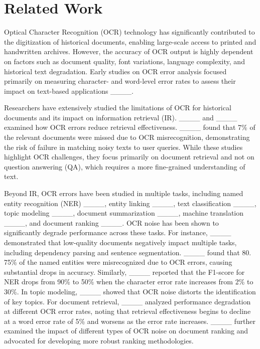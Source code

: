 \section{Related Work}
Optical Character Recognition (OCR) technology has significantly contributed to the digitization of historical documents, enabling large-scale access to printed and handwritten archives. However, the accuracy of OCR output is highly dependent on factors such as document quality, font variations, language complexity, and historical text degradation. Early studies on OCR error analysis focused primarily on measuring character- and word-level error rates to assess their impact on text-based applications ____.

Researchers have extensively studied the limitations of OCR for historical documents and its impact on information retrieval (IR). ____ and ____ examined how OCR errors reduce retrieval effectiveness. ____ found that 7\% of the relevant documents were missed due to OCR misrecognition, demonstrating the risk of failure in matching noisy texts to user queries. While these studies highlight OCR challenges, they focus primarily on document retrieval and not on question answering (QA), which requires a more fine-grained understanding of text.

Beyond IR, OCR errors have been studied in multiple tasks, including named entity recognition (NER) ____, entity linking ____, text classification ____, topic modeling ____, document summarization ____, machine translation ____, and document ranking ____. OCR noise has been shown to significantly degrade performance across these tasks. For instance, ____ demonstrated that low-quality documents negatively impact multiple tasks, including dependency parsing and sentence segmentation.
____ found that 80. 75\% of the named entities were misrecognized due to OCR errors, causing substantial drops in accuracy. Similarly, ____ reported that the F1-score for NER drops from 90\% to 50\% when the character error rate increases from 2\% to 30\%. 
In topic modeling, ____ showed that OCR noise distorts the identification of key topics. For document retrieval, ____ analyzed performance degradation at different OCR error rates, noting that retrieval effectiveness begins to decline at a word error rate of 5\% and worsens as the error rate increases. ____ further examined the impact of different types of OCR noise on document ranking and advocated for developing more robust ranking methodologies.

